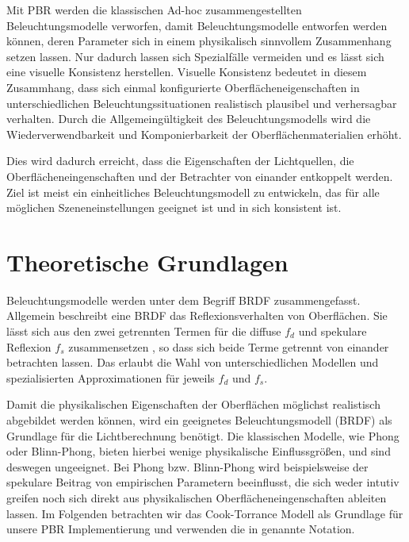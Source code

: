 Mit \ac{PBR} werden die klassischen Ad-hoc zusammengestellten Beleuchtungsmodelle verworfen, damit Beleuchtungsmodelle entworfen werden können, deren Parameter sich in einem physikalisch sinnvollem Zusammenhang setzen lassen. Nur dadurch lassen sich Spezialfälle vermeiden und es lässt sich eine visuelle Konsistenz herstellen. Visuelle Konsistenz bedeutet in diesem Zusammhang, dass sich einmal konfigurierte Oberflächeneigenschaften in unterschiedlichen Beleuchtungssituationen realistisch plausibel und verhersagbar verhalten. Durch die Allgemeingültigkeit des Beleuchtungsmodells wird die Wiederverwendbarkeit und Komponierbarkeit der Oberflächenmaterialien erhöht.

Dies wird dadurch erreicht, dass die Eigenschaften der Lichtquellen, die Oberflächeneingenschaften und der Betrachter von einander entkoppelt werden. Ziel ist meist ein einheitliches Beleuchtungsmodell zu entwickeln, das für alle möglichen Szeneneinstellungen geeignet ist und in sich konsistent ist.

\section{Theoretische Grundlagen}
\label{sec:pbr-grundlagen}

Beleuchtungsmodelle werden unter dem Begriff \acf{BRDF} zusammengefasst. Allgemein beschreibt eine \ac{BRDF} das Reflexionsverhalten von Oberflächen. Sie lässt sich aus den zwei getrennten Termen für die diffuse $f_d$ und spekulare Reflexion $f_s$ zusammensetzen \parencite[Kapitel 3.1.2, Seite 7]{Rousiers2014}, so dass sich beide Terme getrennt von einander betrachten lassen. Das erlaubt die Wahl von unterschiedlichen Modellen und spezialisierten Approximationen für jeweils $f_d$ und $f_s$.

Damit die physikalischen Eigenschaften der Oberflächen möglichst realistisch abgebildet werden können, wird ein geeignetes Beleuchtungsmodell (\ac{BRDF}) als Grundlage für die Lichtberechnung benötigt. Die klassischen Modelle, wie Phong oder Blinn-Phong, bieten hierbei wenige physikalische Einflussgrößen, und sind deswegen ungeeignet. Bei Phong bzw. Blinn-Phong wird beispielsweise der spekulare Beitrag von empirischen Parametern beeinflusst, die sich weder intutiv greifen noch sich direkt aus physikalischen Oberflächeneingenschaften ableiten lassen. Im Folgenden betrachten wir das Cook-Torrance Modell als Grundlage für unsere \ac{PBR} Implementierung und verwenden die in  genannte Notation.

